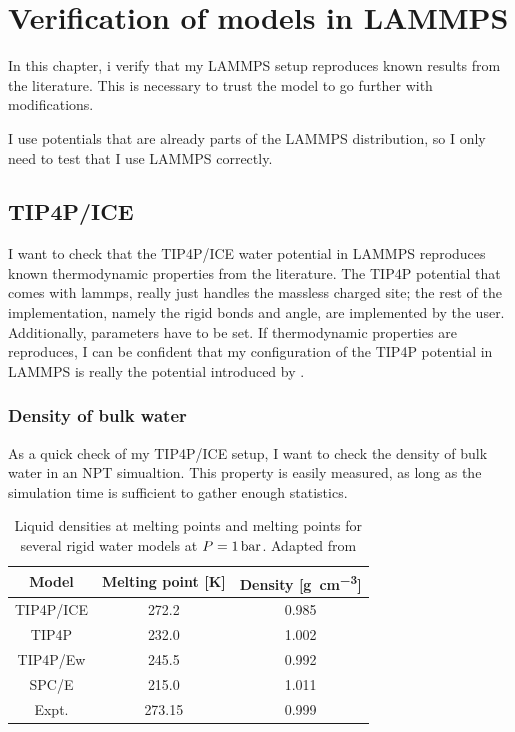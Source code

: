 \chapter{Verification of models in LAMMPS}
In this chapter, i verify that my LAMMPS setup reproduces known results from the literature. This is necessary to trust the model to go further with modifications.

I use potentials that are already parts of the LAMMPS distribution, so I only need to test that I use LAMMPS correctly. 

\section{TIP4P/ICE}
I want to check that the TIP4P/ICE water potential in LAMMPS reproduces known thermodynamic properties from the literature. The TIP4P potential that comes with lammps, really just handles the massless charged site; the rest of the implementation, namely the rigid bonds and angle, are implemented by the user. Additionally, parameters have to be set. If thermodynamic properties are reproduces, I can be confident that my configuration of the TIP4P potential in LAMMPS is really the potential introduced by \cite{Abascal2005}. 

\subsection{Density of bulk water}
As a quick check of my TIP4P/ICE setup, I want to check the density of bulk water in an NPT simualtion. This property is easily measured, as long as the simulation time is sufficient to gather enough statistics. 

\begin{table}
\centering
\caption{Liquid densities at melting points and melting points for several rigid water models at $P = \text{\SI{1}{\bar}}$. Adapted from \cite{Abascal2005}}
\begin{tabular}{c|cc}
Model & Melting point [K] & Density [\si{\gram\per\cubic\cm}] \\
\hline
TIP4P/ICE 	& 272.2 	& 0.985 \\
TIP4P 		& 232.0 	& 1.002 \\
TIP4P/Ew 	& 245.5 	& 0.992 \\
SPC/E 		& 215.0 	& 1.011 \\
Expt. 		& 273.15 	& 0.999
\end{tabular}
\end{table}

